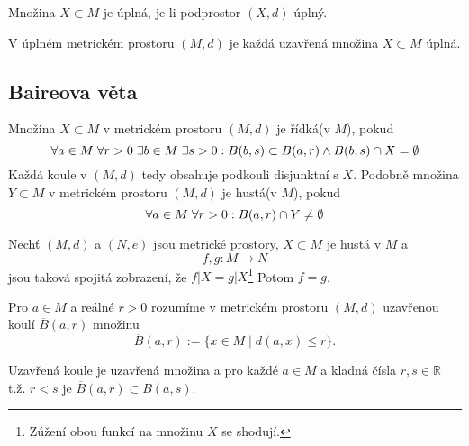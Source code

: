\documentclass[../main.tex]{subfiles}
\begin{document}
\begin{definition}
    Množina $X \subset M$ je úplná, je-li podprostor $(X,d)$ úplný.
\end{definition}

\begin{lemma}
    V úplném metrickém prostoru $(M,d)$ je každá uzavřená množina $X \subset M$ úplná.
\end{lemma}

\subsection{Baireova věta}

\begin{definition}
    Množina $X \subset M$ v metrickém prostoru $(M,d)$ je řídká(v $M$), pokud
    \[ \forall a \in M \hspace{1mm} \forall r > 0 \hspace{1mm} \exists b \in M \hspace{1mm} \exists s > 0: B(b,s) \subset B(a,r) \land B(b,s) \cap X = \emptyset \]
    Každá koule v $(M,d)$ tedy obsahuje podkouli disjunktní s $X$.
    Podobně množina $Y \subset M$ v metrickém prostoru $(M,d)$ je hustá(v $M$), pokud
    \[ \forall a \in M \hspace{1mm} \forall r > 0: B(a,r) \cap Y \neq \emptyset \]
\end{definition}

\begin{lemma}
    Nechť $(M,d)$ a $(N,e)$ jsou metrické prostory, $X \subset M$ je hustá v $M$ a
    \[ f,g: M\to N \]
    jsou taková spojitá zobrazení, že $f|X = g|X$\footnote{Zúžení obou funkcí na množinu $X$ se shodují.} Potom $f=g$.
\end{lemma}

\begin{definition}
    Pro $a \in M$ a reálné $r > 0$ rozumíme v metrickém prostoru $(M,d)$ uzavřenou koulí $\overline{B}(a,r)$ množinu
    \[ \overline{B}(a,r) := \{ x \in M \mid d(a,x) \leq r \}.\]
\end{definition}

\noindent
Uzavřená koule je uzavřená množina a pro každé $a\in M$ a kladná čísla $r,s \in \mathbb{R}$ t.ž. $r<s$ je $\overline{B}(a,r) \subset B(a,s)$.
\end{document}
